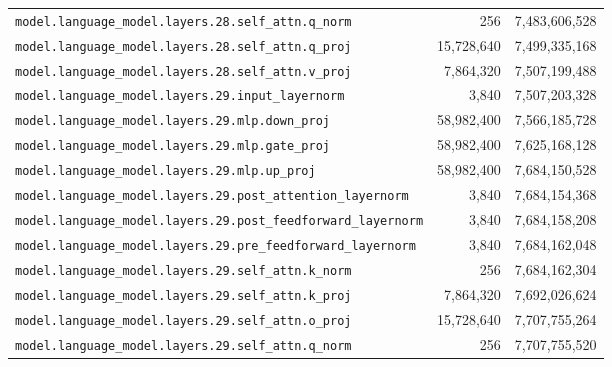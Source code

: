 \documentclass[10pt,a4paper]{article}
\theoremstyle{definition}
\begin{document}
\begin{appendices}
\begin{longtable}{p{9.5cm}rr}
\texttt{model.\allowbreak{}language\_model.\allowbreak{}layers.\allowbreak{}28.\allowbreak{}self\_attn.\allowbreak{}q\_norm} & 256 & 7,483,606,528 \\
\texttt{model.\allowbreak{}language\_model.\allowbreak{}layers.\allowbreak{}28.\allowbreak{}self\_attn.\allowbreak{}q\_proj} & 15,728,640 & 7,499,335,168 \\
\texttt{model.\allowbreak{}language\_model.\allowbreak{}layers.\allowbreak{}28.\allowbreak{}self\_attn.\allowbreak{}v\_proj} & 7,864,320 & 7,507,199,488 \\
\texttt{model.\allowbreak{}language\_model.\allowbreak{}layers.\allowbreak{}29.\allowbreak{}input\_layernorm} & 3,840 & 7,507,203,328 \\
\texttt{model.\allowbreak{}language\_model.\allowbreak{}layers.\allowbreak{}29.\allowbreak{}mlp.\allowbreak{}down\_proj} & 58,982,400 & 7,566,185,728 \\
\texttt{model.\allowbreak{}language\_model.\allowbreak{}layers.\allowbreak{}29.\allowbreak{}mlp.\allowbreak{}gate\_proj} & 58,982,400 & 7,625,168,128 \\
\texttt{model.\allowbreak{}language\_model.\allowbreak{}layers.\allowbreak{}29.\allowbreak{}mlp.\allowbreak{}up\_proj} & 58,982,400 & 7,684,150,528 \\
\texttt{model.\allowbreak{}language\_model.\allowbreak{}layers.\allowbreak{}29.\allowbreak{}post\_attention\_layernorm} & 3,840 & 7,684,154,368 \\
\texttt{model.\allowbreak{}language\_model.\allowbreak{}layers.\allowbreak{}29.\allowbreak{}post\_feedforward\_layernorm} & 3,840 & 7,684,158,208 \\
\texttt{model.\allowbreak{}language\_model.\allowbreak{}layers.\allowbreak{}29.\allowbreak{}pre\_feedforward\_layernorm} & 3,840 & 7,684,162,048 \\
\texttt{model.\allowbreak{}language\_model.\allowbreak{}layers.\allowbreak{}29.\allowbreak{}self\_attn.\allowbreak{}k\_norm} & 256 & 7,684,162,304 \\
\texttt{model.\allowbreak{}language\_model.\allowbreak{}layers.\allowbreak{}29.\allowbreak{}self\_attn.\allowbreak{}k\_proj} & 7,864,320 & 7,692,026,624 \\
\texttt{model.\allowbreak{}language\_model.\allowbreak{}layers.\allowbreak{}29.\allowbreak{}self\_attn.\allowbreak{}o\_proj} & 15,728,640 & 7,707,755,264 \\
\texttt{model.\allowbreak{}language\_model.\allowbreak{}layers.\allowbreak{}29.\allowbreak{}self\_attn.\allowbreak{}q\_norm} & 256 & 7,707,755,520 \\

\end{longtable}
\end{appendices}
\end{document}

